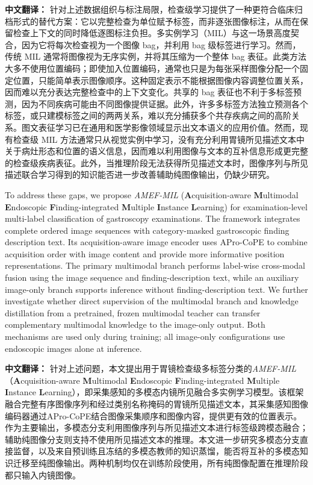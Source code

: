 \documentclass[Afour,sagev,times]{sagej}
\begin{document}
\noindent\textbf{中文翻译：}
针对上述数据组织与标注局限，检查级学习提供了一种更符合临床归档形式的替代方案：它以完整检查为单位赋予标签，而非逐张图像标注，从而在保留检查上下文的同时降低逐图标注负担。多实例学习（MIL）与这一场景高度契合，因为它将每次检查视为一个图像 bag，并利用 bag 级标签进行学习。然而，传统 MIL 通常将图像视为无序实例，并将其压缩为一个整体 bag 表征。此类方法大多不使用位置编码；即使加入位置编码，通常也只是为每张采样图像分配一个固定位置，只能简单表示图像顺序。这种固定表示不能根据图像内容调整位置关系，因而难以充分表达完整检查中的上下文变化。共享的 bag 表征也不利于多标签预测，因为不同疾病可能由不同图像提供证据。此外，许多多标签方法独立预测各个标签，或只建模标签之间的两两关系，难以充分捕获多个共存疾病之间的高阶关系。图文表征学习已在通用和医学影像领域显示出文本语义的应用价值。然而，现有检查级 MIL 方法通常只从视觉实例中学习，没有充分利用胃镜所见描述文本中关于病灶形态和位置的语义信息，因而难以利用图像与文本的互补信息形成更完整的检查级疾病表征。此外，当推理阶段无法获得所见描述文本时，图像序列与所见描述联合学习得到的知识能否进一步改善辅助纯图像输出，仍缺少研究。

To address these gaps, we propose \textit{AMEF-MIL} (\textbf{A}cquisition-aware \textbf{M}ultimodal \textbf{E}ndoscopic \textbf{F}inding-integrated \textbf{M}ultiple \textbf{I}nstance \textbf{L}earning) for examination-level multi-label classification of gastroscopy examinations. The framework integrates complete ordered image sequences with category-masked gastroscopic finding description text. Its acquisition-aware image encoder uses APro-CoPE to combine acquisition order with image content and provide more informative position representations. The primary multimodal branch performs label-wise cross-modal fusion using the image sequence and finding-description text, while an auxiliary image-only branch supports inference without finding-description text. We further investigate whether direct supervision of the multimodal branch and knowledge distillation from a pretrained, frozen multimodal teacher can transfer complementary multimodal knowledge to the image-only output. Both mechanisms are used only during training; all image-only configurations use endoscopic images alone at inference.

\noindent\textbf{中文翻译：}
针对上述问题，本文提出用于胃镜检查级多标签分类的\textit{AMEF-MIL}（\textbf{A}cquisition-aware \textbf{M}ultimodal \textbf{E}ndoscopic \textbf{F}inding-integrated \textbf{M}ultiple \textbf{I}nstance \textbf{L}earning），即采集感知的多模态内镜所见融合多实例学习模型。该框架融合完整有序图像序列和经过类别名称掩码的胃镜所见描述文本，其采集感知图像编码器通过APro-CoPE结合图像采集顺序和图像内容，提供更有效的位置表示。作为主要输出，多模态分支利用图像序列与所见描述文本进行标签级跨模态融合；辅助纯图像分支则支持不使用所见描述文本的推理。本文进一步研究多模态分支直接监督，以及来自预训练且冻结的多模态教师的知识蒸馏，能否将互补的多模态知识迁移至纯图像输出。两种机制均仅在训练阶段使用，所有纯图像配置在推理阶段都只输入内镜图像。
\end{document}
